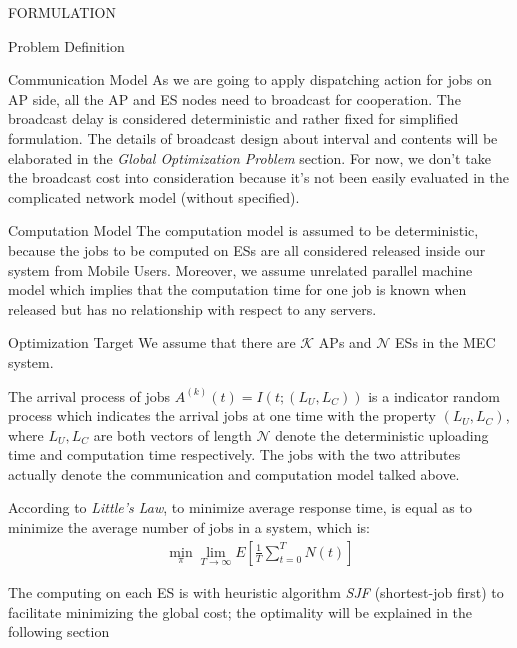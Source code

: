 \documentclass[10pt, conference, letterpaper]{IEEEtran}
\begin{document}
\begin{section}{FORMULATION}
\begin{subsection}{Problem Definition}
\begin{subsubsection}{Communication Model}
                As we are going to apply dispatching action for jobs on AP side, all the AP and ES nodes need to broadcast for cooperation. The broadcast delay is considered deterministic and rather fixed {for simplified formulation}.
                The details of broadcast design about interval and contents will be elaborated in the \textit{Global Optimization Problem} section.
                For now, we don't take the broadcast cost into consideration because it's not been easily evaluated in the complicated network model (without specified).
            \end{subsubsection}

            \begin{subsubsection}{Computation Model}
                The computation model is assumed to be deterministic, because the jobs to be computed on ESs are all considered released inside our system from Mobile Users.
                Moreover, we assume unrelated parallel machine model which implies that the computation time for one job is known when released but has no relationship with respect to any servers.
            \end{subsubsection}

            \begin{subsubsection}{Optimization Target}
                We assume that there are $\mathcal{K}$ APs and $\mathcal{N}$ ESs in the MEC system.

                The arrival process of jobs $A^{(k)}(t)=I(t; (L_U, L_C))$ is a indicator random process which indicates the arrival jobs at one time with the property $(L_U, L_C)$, where $L_U, L_C$ are both vectors of length $\mathcal{N}$ denote the deterministic uploading time and computation time respectively.
                The jobs with the two attributes actually denote the communication and computation model talked above.
                
                According to \emph{Little’s Law}, to minimize average response time, is equal as to minimize the average number of jobs in a system, which is:
                \begin{gather}
                    \min_{\pi} \lim_{T \to \infty} E[\frac{1}{T} \sum_{t=0}^{T} N(t)]
                \end{gather}

                The computing on each ES is with heuristic algorithm \emph{SJF} (shortest-job first) to facilitate minimizing the global cost; the optimality will be explained in the following section 
            \end{subsubsection}


\end{subsection}
\end{section}
\end{document}
